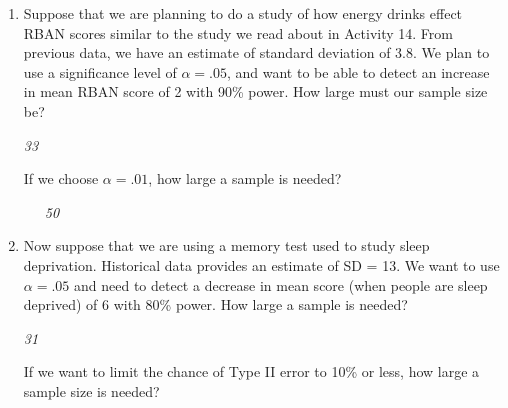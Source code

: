 \begin{enumerate}
\begin{key}
  {\it     It would increase (power and significance level change in the
    same direction). }
\end{key}

\begin{center}
  {\bf Planning a new study}
\end{center}
  \item   Suppose that we are planning to do a study of how energy
    drinks effect RBAN scores similar to the study we read about in
    Activity 14.  From previous data, we have an estimate of standard
    deviation of 3.8. We plan to use a significance level of $\alpha =
    .05$, and want to be able to detect an increase in mean RBAN score
    of 2 with 90\% power.   How large must our sample size be?
\begin{students}
 \vspace{1cm} %
\end{students}

\begin{key}
  {\it  33}
\end{key}


      If we choose $\alpha = .01$, how large a sample is needed?
\begin{students}
 \vspace{1cm}
\end{students}
\begin{key}
\ \ \   {\it 50}
\end{key}

  \item  Now suppose that we are using a memory test used to study
    sleep deprivation.  Historical data 
    provides an estimate of SD = 13.  We want to use $\alpha = .05$ and
    need to detect a decrease in mean score (when people are sleep
    deprived) of 6 with 80\% power.  
    How large a sample is needed? 
\begin{students}
 \vspace{1cm} %
\end{students}

\begin{key}
  {\it  31}
\end{key}


    If we want to limit the chance of Type II error to 10\% or less,
    how large a sample size is needed? 
\begin{students}
 \vspace{1cm}\\
\end{students}


\end{enumerate}
